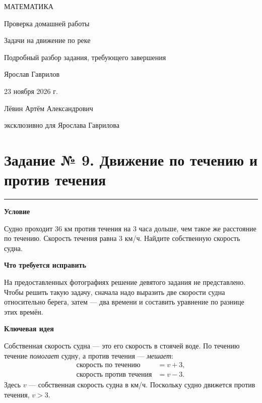 \documentclass[a4paper,11pt]{article}
\newcommand{\sectlabel}[1]{\par\medskip\textbf{\color{darkaccent}#1}\par\vspace{-2pt}}
\begin{document}
\thispagestyle{empty}
\begin{center}
\vspace*{28mm}
{\large\color{darkaccent}МАТЕМАТИКА}\par
\vspace{24mm}
{\LARGE\color{ink}Проверка домашней работы}\par
\vspace{12mm}
{\Large\color{accent}Задачи на движение по реке}\par
\vspace{11mm}
{\normalsize\color{muted}Подробный разбор задания, требующего завершения}\par
\vfill
{\large Ярослав Гаврилов}\par
\vspace{10mm}
{\large 23 ноября 2026 г.}\par
\vfill
{\small Лёвин Артём Александрович}\par
{\small эксклюзивно для Ярослава Гаврилова}\par
\vspace{15mm}
\end{center}
\clearpage
\section*{\color{darkaccent}Задание № 9. Движение по течению и против течения}
\vspace{-3mm}
\textcolor{accent}{\rule{\linewidth}{0.45pt}}

\sectlabel{Условие}
Судно проходит $36$ км против течения на $3$ часа дольше, чем такое же расстояние по течению. Скорость течения равна $3$ км/ч. Найдите собственную скорость судна.

\sectlabel{Что требуется исправить}
На предоставленных фотографиях решение девятого задания не представлено. Чтобы решить такую задачу, сначала надо выразить две скорости судна относительно берега, затем --- два времени и составить уравнение по разнице этих времён.

\sectlabel{Ключевая идея}
Собственная скорость судна --- это его скорость в стоячей воде. По течению течение \emph{помогает} судну, а против течения --- \emph{мешает}:
\[
\begin{aligned}
\text{скорость по течению}&=v+3,\\
\text{скорость против течения}&=v-3.
\end{aligned}
\]
Здесь $v$ --- собственная скорость судна в км/ч. Поскольку судно движется против течения, $v>3$.
\end{document}
